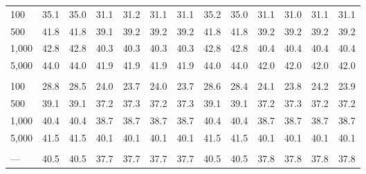 \documentclass[AMA,STIX1COL,doublespace]{WileyNJD-v2}
\begin{document}
\begin{table}
\begin{tabular}[t]{lcccccccccccc}
\addlinespace[0.75em]
\multicolumn{13}{l}{\textbf{10 predictors, 40 junk}}\\
\hline
\hspace{1em}100 & 35.1 & 35.0 & 31.1 & 31.2 & 31.1 & 31.1 & 35.2 & 35.0 & 31.1 & 31.0 & 31.1 & 31.1\\
\hspace{1em}500 & 41.8 & 41.8 & 39.1 & 39.2 & 39.2 & 39.2 & 41.8 & 41.8 & 39.2 & 39.2 & 39.2 & 39.2\\
\hspace{1em}1,000 & 42.8 & 42.8 & 40.3 & 40.3 & 40.3 & 40.3 & 42.8 & 42.8 & 40.4 & 40.4 & 40.4 & 40.4\\
\hspace{1em}5,000 & 44.0 & 44.0 & 41.9 & 41.9 & 41.9 & 41.9 & 44.0 & 44.0 & 42.0 & 42.0 & 42.0 & 42.0\\
\addlinespace[0.75em]
\multicolumn{13}{l}{\textbf{10 predictors, 490 junk}}\\
\hline
\hspace{1em}100 & 28.8 & 28.5 & 24.0 & 23.7 & 24.0 & 23.7 & 28.6 & 28.4 & 24.1 & 23.8 & 24.2 & 23.9\\
\hspace{1em}500 & 39.1 & 39.1 & 37.2 & 37.3 & 37.2 & 37.3 & 39.1 & 39.1 & 37.2 & 37.3 & 37.2 & 37.2\\
\hspace{1em}1,000 & 40.4 & 40.4 & 38.7 & 38.7 & 38.7 & 38.7 & 40.4 & 40.4 & 38.7 & 38.7 & 38.7 & 38.7\\
\hspace{1em}5,000 & 41.5 & 41.5 & 40.1 & 40.1 & 40.1 & 40.1 & 41.5 & 41.5 & 40.1 & 40.1 & 40.1 & 40.1\\
\addlinespace[0.75em]
\multicolumn{13}{l}{\textbf{Overall}}\\
\hline
\hspace{1em}--- & 40.5 & 40.5 & 37.7 & 37.7 & 37.7 & 37.7 & 40.5 & 40.5 & 37.8 & 37.8 & 37.8 & 37.8\\
\bottomrule
\end{tabular}
\end{table}

\FloatBarrier
\end{document}

